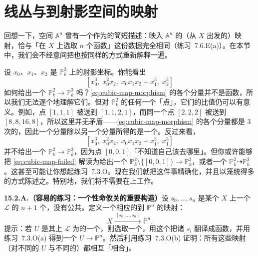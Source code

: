 
\section{线丛与到射影空间的映射}

回想一下，\trAffine{}空间 $\mathbb{A}^n$ 曾有一个作为\trRepresentableFunctor{}的简短描述：映入 $\mathbb{A}^n$ 的（从 $X$ 出发的）映射，恰与「在 $X$ 上选取 $n$ 个函数」这份数据完全相同（\mbox{练习~7.6.E}(a)）。在本节中，我们会不经意间把\trProjectiveSpace{}也按同样的方式重新解释一遍。

设 $x_0$、$x_1$、$x_2$ 是 $\mathbb{P}^2_k$ 上的射影坐标。你能看出
\begin{equation*}\tag{15.2.0.1}\label{eq:cubic-map-morphism}
[x_0^3,\; x_0^2x_2,\; x_0x_1x_2+x_1^3,\; x_2^3]
\end{equation*}
如何给出一个\trMorphism{} $\mathbb{P}^2_k\to\mathbb{P}^3_k$ 吗？\eqref{eq:cubic-map-morphism} 的各个分量并不是函数，所以我们无法逐个地理解它们。但对 $\mathbb{P}^2_k$ 的任何一个「点」，它们的比值仍可以有意义。例如，点 $[1,1,1]$ 被送到 $[1,1,2,1]$，而同一个点 $[2,2,2]$ 被送到 $[8,8,16,8]$，所以这里并无矛盾——\eqref{eq:cubic-map-morphism} 的各个分量都是 $3$ 次\trHomogeneous{}的，因此一个分量除以另一个分量所得的\trQuotient{}是一个\trRationalFunction。反过来看，
\begin{equation*}\tag{15.2.0.2}\label{eq:cubic-map-failed}
[x_0^3,\; x_0^2x_2,\; x_0x_1x_2+x_1^3,\; x_1^3]
\end{equation*}
并不给出一个\trMorphism{} $\mathbb{P}^2_k\to\mathbb{P}^3_k$，因为点 $[0,0,1]$「不知道自己该去哪里」。但你或许能够把 \eqref{eq:cubic-map-failed} 解读为给出一个\trMorphism{} $\mathbb{P}^2_k\setminus\{[0,0,1]\}\to\mathbb{P}^3_k$，或者一个\trRationalMap{} $\mathbb{P}^2_k\dashrightarrow\mathbb{P}^3_k$。这甚至可能让你想起\mbox{练习~7.3.O}。现在我们就把这件事精确化，并且以笼统得多的方式陈述之。特别地，我们将不需要在\trField{}上工作。

\textbf{15.2.A.（容易的练习：一个性命攸关的重要构造）}\quad 设 $s_0,\dots,s_n$ 是某个\trScheme{} $X$ 上一个\trInvertibleSheaf{} $\mathscr{L}$ 的 $n+1$ 个\trGlobalSections，没有公共\trZeros。定义一个相应的到 $\mathbb{P}^n$ 的映射：
\[
X\xrightarrow{\;[s_0,\dots,s_n]\;}\mathbb{P}^n.
\]
提示：若 $U$ 是其上 $\mathscr{L}$ 为\trTrivial{}的一个\trOpenSubset，则选取一个\trTrivialization，用这个\trTrivialization{}把诸 $s_i$ 翻译成函数，并用\mbox{练习~7.3.O}(a) 得到一个\trMorphism{} $U\to\mathbb{P}^n$。然后利用\mbox{练习~7.3.O}(b) 证明：所有这些映射（对不同的 $U$ 与不同的\trTrivialization）都相互「相合」。

